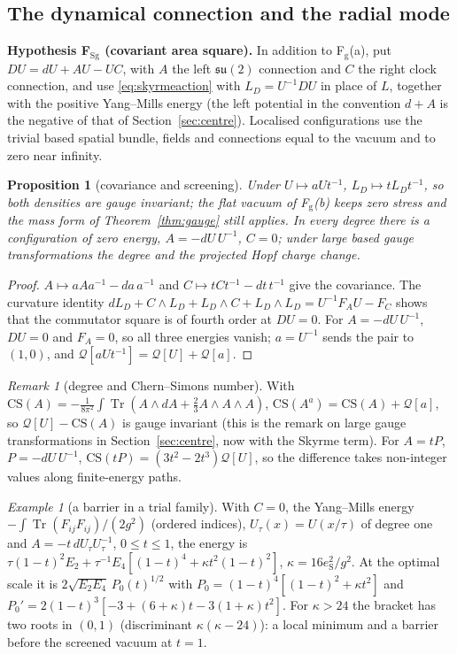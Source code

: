 \documentclass[aps,pra,onecolumn,superscriptaddress,nofootinbib,10pt]{revtex4-2}
\newtheorem{proposition}[theorem]{Proposition}
\theoremstyle{definition}
\theoremstyle{remark}
\newtheorem{remark}[theorem]{Remark}
\newtheorem{example}[theorem]{Example}
\newcommand{\su}{\mathfrak{su}}
\newcommand{\tr}{\operatorname{Tr}}
\begin{document}
\subsection{The dynamical connection and the radial mode}

\smallskip\noindent\textbf{Hypothesis F$_{\mathrm{Sg}}$ (covariant area square).}  In addition to F$_{\mathrm g}$(a), put $DU=dU+AU-UC$, with $A$
the left $\su(2)$ connection and $C$ the right clock connection, and use \eqref{eq:skyrmeaction} with $L_D=U^{-1}DU$ in place of $L$,
together with the positive Yang--Mills energy (the left potential in the convention $d+A$ is the negative of
that of Section~\ref{sec:centre}).  Localised configurations use the trivial based spatial bundle, fields and
connections equal to the vacuum and to zero near infinity.

\begin{proposition}[covariance and screening]\label{prop:skscreen}
Under $U\mapsto aUt^{-1}$, $L_D\mapsto tL_Dt^{-1}$, so both densities are gauge invariant; the flat vacuum of F$_{\mathrm g}$(b) keeps zero
stress and the mass form of Theorem~\ref{thm:gauge} still applies.  In every degree there is a configuration of
zero energy, $A=-dU\,U^{-1}$, $C=0$; under large based gauge transformations the degree and the projected Hopf
charge change.
\end{proposition}
\begin{proof}
$A\mapsto aAa^{-1}-da\,a^{-1}$ and $C\mapsto tCt^{-1}-dt\,t^{-1}$ give the covariance.  The curvature identity
$dL_D+C\wedge L_D+L_D\wedge C+L_D\wedge L_D=U^{-1}F_AU-F_C$ shows that the commutator square is of fourth order at $DU=0$.  For
$A=-dU\,U^{-1}$, $DU=0$ and $F_A=0$, so all three energies vanish; $a=U^{-1}$ sends the pair to $(1,0)$, and
$\mathcal Q[aUt^{-1}]=\mathcal Q[U]+\mathcal Q[a]$.
\end{proof}
\begin{remark}[degree and Chern--Simons number]\label{rem:skcs}
With $\mathrm{CS}(A)=-\frac1{8\pi^2}\int\tr(A\wedge dA+\tfrac23A\wedge A\wedge A)$, $\mathrm{CS}(A^a)=\mathrm{CS}(A)+\mathcal Q[a]$, so $\mathcal Q[U]-\mathrm{CS}(A)$ is gauge invariant
(this is the remark on large gauge transformations in Section~\ref{sec:centre}, now with the Skyrme term).  For
$A=tP$, $P=-dU\,U^{-1}$, $\mathrm{CS}(tP)=(3t^2-2t^3)\mathcal Q[U]$, so the difference takes non-integer values along finite-energy
paths.
\end{remark}
\begin{example}[a barrier in a trial family]\label{ex:skbarrier}
With $C=0$, the Yang--Mills energy $-\int\tr(F_{ij}F_{ij})/(2g^2)$ (ordered indices), $U_\tau(x)=U(x/\tau)$ of degree one and
$A=-t\,dU_\tau U_\tau^{-1}$, $0\le t\le1$, the energy is $\tau(1-t)^2E_2+\tau^{-1}E_4[(1-t)^4+\kappa t^2(1-t)^2]$, $\kappa=16e_{\mathrm S}^2/g^2$.  At the
optimal scale it is $2\sqrt{E_2E_4}\,P_0(t)^{1/2}$ with $P_0=(1-t)^4[(1-t)^2+\kappa t^2]$ and
$P_0'=2(1-t)^3[-3+(6+\kappa)t-3(1+\kappa)t^2]$.  For $\kappa>24$ the bracket has two roots in $(0,1)$ (discriminant
$\kappa(\kappa-24)$): a local minimum and a barrier before the screened vacuum at $t=1$.
\end{example}
\end{document}
